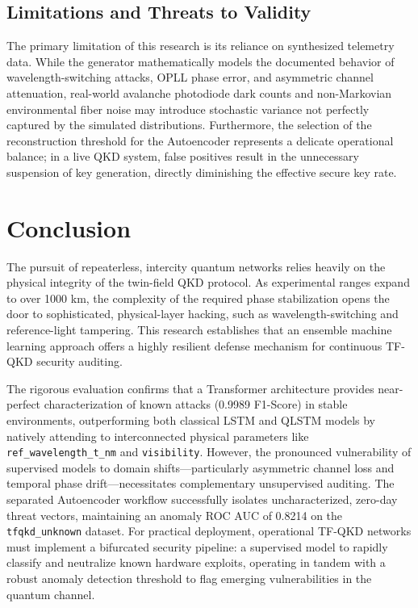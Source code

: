 \documentclass[conference]{IEEEtran}
\begin{document}
\begin{table}[h]
\subsection{Limitations and Threats to Validity}
The primary limitation of this research is its reliance on synthesized telemetry data. While the generator mathematically models the documented behavior of wavelength-switching attacks, OPLL phase error, and asymmetric channel attenuation, real-world avalanche photodiode dark counts and non-Markovian environmental fiber noise may introduce stochastic variance not perfectly captured by the simulated distributions. Furthermore, the selection of the reconstruction threshold for the Autoencoder represents a delicate operational balance; in a live QKD system, false positives result in the unnecessary suspension of key generation, directly diminishing the effective secure key rate. 

\section{Conclusion}

The pursuit of repeaterless, intercity quantum networks relies heavily on the physical integrity of the twin-field QKD protocol. As experimental ranges expand to over 1000 km, the complexity of the required phase stabilization opens the door to sophisticated, physical-layer hacking, such as wavelength-switching and reference-light tampering. This research establishes that an ensemble machine learning approach offers a highly resilient defense mechanism for continuous TF-QKD security auditing.

The rigorous evaluation confirms that a Transformer architecture provides near-perfect characterization of known attacks (0.9989 F1-Score) in stable environments, outperforming both classical LSTM and QLSTM models by natively attending to interconnected physical parameters like \texttt{ref\_wavelength\_t\_nm} and \texttt{visibility}. However, the pronounced vulnerability of supervised models to domain shifts---particularly asymmetric channel loss and temporal phase drift---necessitates complementary unsupervised auditing. The separated Autoencoder workflow successfully isolates uncharacterized, zero-day threat vectors, maintaining an anomaly ROC AUC of 0.8214 on the \texttt{tfqkd\_unknown} dataset. For practical deployment, operational TF-QKD networks must implement a bifurcated security pipeline: a supervised model to rapidly classify and neutralize known hardware exploits, operating in tandem with a robust anomaly detection threshold to flag emerging vulnerabilities in the quantum channel.


\end{table}
\end{document}
